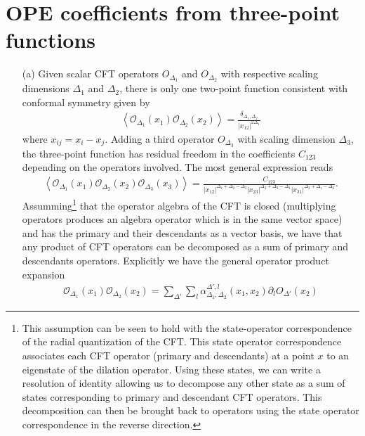 \documentclass[10pt, a4paper]{article}
\begin{document}
{\section{OPE coefficients from three-point functions}

\begin{enumerate}
  \item[(a)] Given scalar CFT operators $O_{\Delta_1}$ and $O_{\Delta_2}$ with respective scaling dimensions $\Delta_1$ and $\Delta_2$, there is only one two-point function consistent with conformal symmetry given by 
  \begin{align*}
    \left\langle\mathcal{O}_{\Delta_1}(x_1) \mathcal{O}_{\Delta_2}(x_2)\right\rangle=\frac{\delta_{\Delta_1, \Delta_2}}{|x_{12}|^{2 \Delta_1}}
  \end{align*}
  where $x_{ij} = x_i - x_j$. Adding a third operator $O_{\Delta_3}$ with scaling dimension $\Delta_3$, the three-point function has residual freedom in the coefficients $C_{123}$ depending on the operators involved. The most general expression reads 
  \begin{align*}
    \left\langle\mathcal{O}_{\Delta_1}\left(x_1\right) \mathcal{O}_{\Delta_2}\left(x_2\right) \mathcal{O}_{\Delta_3}\left(x_3\right)\right\rangle=\frac{C_{123}}{|x_{12}|^{\Delta_1+\Delta_2-\Delta_3} |x_{23}|^{\Delta_2+\Delta_3-\Delta_1} |x_{31}|^{\Delta_3+\Delta_1-\Delta_2}}.
  \end{align*}
  Assumming\footnote{This assumption can be seen to hold with the state-operator correspondence of the radial quantization of the CFT. This state operator correspondence associates each CFT operator (primary and descendants) at a point $x$ to an eigenstate of the dilation operator. Using these states, we can write a resolution of identity allowing us to decompose any other state as a sum of states corresponding to primary and descendant CFT operators. This decomposition can then be brought back to operators using the state operator correspondence in the reverse direction.} that the operator algebra of the CFT is closed (multiplying operators produces an algebra operator which is in the same vector space) and has the primary and their descendants as a vector basis, we have that any product of CFT operators can be decomposed as a sum of primary and descendants operators. Explicitly we have the general operator product expansion
  \begin{align*}
    \mathcal{O}_{\Delta_1}\left(x_1\right) \mathcal{O}_{\Delta_2}\left(x_2\right) = \sum_{\Delta'} \sum_l \alpha^{\Delta', l}_{\Delta_1, \Delta_2} (x_{1}, x_{2}) \partial_{l} O_{\Delta'}(x_2)

\end{align*}
\end{enumerate}}
\end{document}
